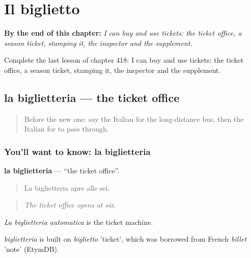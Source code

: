 
\chapter{Il biglietto}
\label{ch:it-il-biglietto}

\begin{chapteropening}
\textbf{By the end of this chapter:} \emph{I can buy and use tickets: the ticket office, a season ticket, stamping it, the inspector and the supplement.}

Complete the last lesson of chapter 418: I can buy and use tickets: the ticket office, a season ticket, stamping it, the inspector and the supplement.
\end{chapteropening}

\section[la biglietteria]{la biglietteria — the ticket office}

\label{lesson:IT-C418-biglietteria}



\begin{quote}
Before the new one: say the Italian for the long-distance bus, then the Italian for to pass through.
\end{quote}

\subsection*{You'll want to know: la biglietteria}
\textbf{la biglietteria} — \textquotedblleft{}the ticket office\textquotedblright{}.

\begin{quote}
La biglietteria apre alle sei.
\end{quote}

\begin{quote}
\emph{The ticket office opens at six.}
\end{quote}

\emph{La biglietteria automatica} is the ticket machine.

\begin{cousinweb}
\emph{biglietteria} is built on \emph{biglietto} 'ticket', which was borrowed from French \emph{billet} 'note' (EtymDB).
\end{cousinweb}

